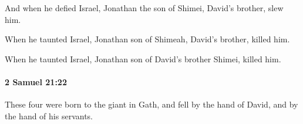 			\begin{versebox}
					\item[BHS] 
					\item[ASV] And when he defied Israel, Jonathan the son of Shimei, David's brother, slew him.
					\item[NIV] When he taunted Israel, Jonathan son of Shimeah, David’s brother, killed him.
					\item[NRSV] When he taunted Israel, Jonathan son of David’s brother Shimei, killed him.
			\end{versebox}

		\paragraph{2 Samuel 21:22} %
			\label{2SAMUEL-21-22}

			These four were born to the giant in Gath, and fell by the hand of David, and by the hand of his servants.

